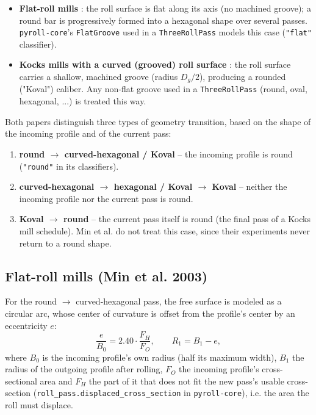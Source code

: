 \documentclass[11pt]{PyRollDocs}
\begin{document}
    \begin{itemize}
        \item \textbf{Flat-roll mills} \parencite{min2003}: the roll surface is flat
        along its axis (no machined groove); a round bar is progressively formed into
        a hexagonal shape over several passes. \texttt{pyroll-core}'s
        \texttt{FlatGroove} used in a \texttt{ThreeRollPass} models this case
        (\texttt{"flat"} classifier).
        \item \textbf{Kocks mills with a curved (grooved) roll surface}
        \parencite{byon2017}: the roll surface carries a shallow, machined groove
        (radius $D_g/2$), producing a rounded ("Koval") caliber. Any non-flat groove
        used in a \texttt{ThreeRollPass} (round, oval, hexagonal, ...) is treated this
        way.
    \end{itemize}

    Both papers distinguish three types of geometry transition, based on the shape of
    the incoming profile and of the current pass:

    \begin{enumerate}
        \item \textbf{round $\to$ curved-hexagonal / Koval} -- the incoming profile is
        round (\texttt{"round"} in its classifiers).
        \item \textbf{curved-hexagonal $\to$ hexagonal / Koval $\to$ Koval} -- neither
        the incoming profile nor the current pass is round.
        \item \textbf{Koval $\to$ round} -- the current pass itself is round (the final
        pass of a Kocks mill schedule). Min et al. do not treat this case, since their
        experiments never return to a round shape.
    \end{enumerate}

    \subsection{Flat-roll mills (Min et al. 2003)}\label{subsec:min}

    For the round $\to$ curved-hexagonal pass, the free surface is modeled as a
    circular arc, whose center of curvature is offset from the profile's center by an
    eccentricity $e$:
    \[
        \frac{e}{B_0} = 2.40 \cdot \frac{F_H}{F_O}, \qquad R_1 = B_1 - e,
    \]
    where $B_0$ is the incoming profile's own radius (half its maximum width), $B_1$
    the radius of the outgoing profile after rolling, $F_O$ the incoming profile's
    cross-sectional area and $F_H$ the part of it that does not fit the new pass's
    usable cross-section (\texttt{roll\_pass.displaced\_cross\_section} in
    \texttt{pyroll-core}), i.e. the area the roll must displace.
\end{document}

